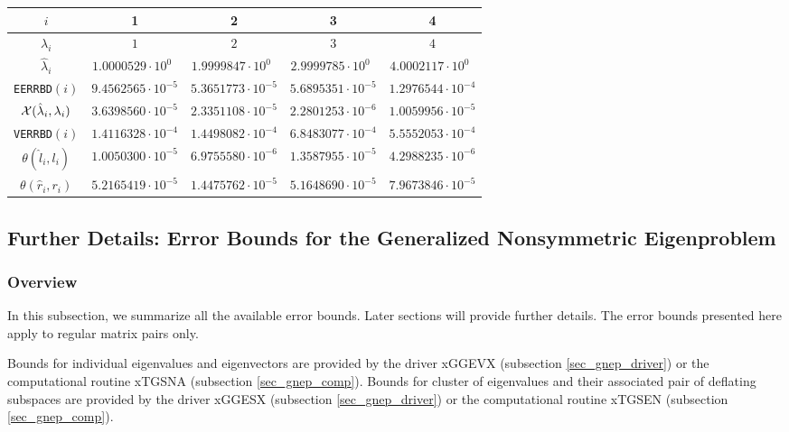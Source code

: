 \begin{center}
\begin{tabular}{||c|c c c c||} \hline
  $i$   &      1   &      2       &       3       & 4 \\ \hline
$\lambda_i$        & $1$ & $2$ & $3$ & $4$ \\
$\hat{\lambda}_i$
        &  $1.0000529 \cdot 10^0~~$ & $1.9999847 \cdot 10^0~~$
        &  $2.9999785 \cdot 10^0~~$  & $4.0002117 \cdot 10^0~~$ \\ \hline
\verb+EERRBD+$(i)$
        &  $9.4562565 \cdot 10^{-5}$ & $5.3651773 \cdot 10^{-5}$
        &  $5.6895351 \cdot 10^{-5}$ & $1.2976544 \cdot 10^{-4}$ \\
${\cal X}(\hat{\lambda}_i, \lambda_i )$
        &  $3.6398560 \cdot 10^{-5}$ & $2.3351108 \cdot 10^{-5}$
        &  $2.2801253 \cdot 10^{-6}$ & $1.0059956 \cdot 10^{-5}$ \\ \hline
\verb+VERRBD+$(i)$
        &  $1.4116328 \cdot 10^{-4}$ & $1.4498082 \cdot 10^{-4}$
        &  $6.8483077 \cdot 10^{-4}$ & $5.5552053 \cdot 10^{-4}$ \\
$\theta(\hat{l}_i,l_i)$
        &  $1.0050300 \cdot 10^{-5}$ & $6.9755580 \cdot 10^{-6}$
        &  $1.3587955 \cdot 10^{-5}$ & $4.2988235 \cdot 10^{-6}$ \\
$\theta(\hat{r}_i,r_i)$
        &  $5.2165419 \cdot 10^{-5}$ & $1.4475762 \cdot 10^{-5}$
        &  $5.1648690 \cdot 10^{-5}$ & $7.9673846 \cdot 10^{-5}$ \\ \hline
\end{tabular}
\end{center}

\subsection{Further Details: Error Bounds for the Generalized
Nonsymmetric Eigenproblem}

\subsubsection{Overview}\label{GNEP311}
In this subsection, we summarize all the available error bounds.
Later sections will provide further details.
The error bounds presented here apply to regular matrix pairs only.

Bounds for individual eigenvalues and eigenvectors are provided by
the driver
xGGEVX
(subsection \ref{sec_gnep_driver})
or the computational routine xTGSNA
(subsection \ref{sec_gnep_comp}).
Bounds for cluster of eigenvalues
and their associated pair of deflating
subspaces are provided by the driver
xGGESX
(subsection \ref{sec_gnep_driver}) or the
computational routine xTGSEN
(subsection \ref{sec_gnep_comp}).

